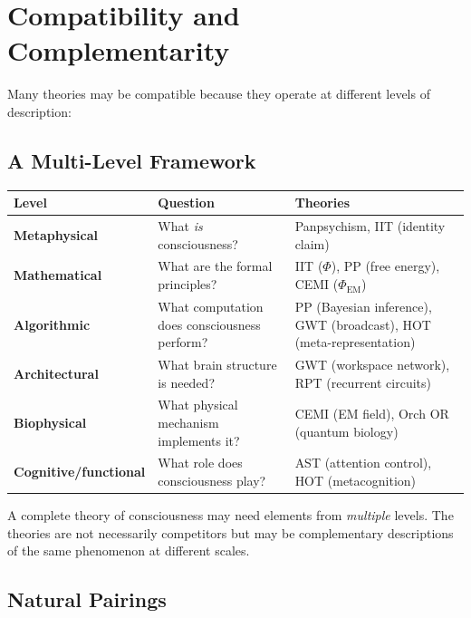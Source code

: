 \documentclass[11pt,a4paper]{report}
\begin{document}
\chapter{Compatibility and Complementarity}

Many theories may be compatible because they operate at different levels of description:

\section{A Multi-Level Framework}

\begin{synthbox}
\begin{center}
\renewcommand{\arraystretch}{1.5}
\begin{tabular}{>{\raggedright}p{3.5cm} >{\raggedright}p{4cm} >{\raggedright\arraybackslash}p{5cm}}
  \toprule
  \textbf{Level} & \textbf{Question} & \textbf{Theories} \\
  \midrule
  \textbf{Metaphysical} & What \emph{is} consciousness? & Panpsychism, IIT (identity claim) \\
  \textbf{Mathematical} & What are the formal principles? & IIT ($\Phi$), PP (free energy), CEMI ($\Phi_{\text{EM}}$) \\
  \textbf{Algorithmic} & What computation does consciousness perform? & PP (Bayesian inference), GWT (broadcast), HOT (meta-representation) \\
  \textbf{Architectural} & What brain structure is needed? & GWT (workspace network), RPT (recurrent circuits) \\
  \textbf{Biophysical} & What physical mechanism implements it? & CEMI (EM field), Orch OR (quantum biology) \\
  \textbf{Cognitive/functional} & What role does consciousness play? & AST (attention control), HOT (metacognition) \\
  \bottomrule
\end{tabular}
\end{center}
A complete theory of consciousness may need elements from \emph{multiple} levels. The theories are not necessarily competitors but may be complementary descriptions of the same phenomenon at different scales.
\end{synthbox}

\section{Natural Pairings}
\end{document}
